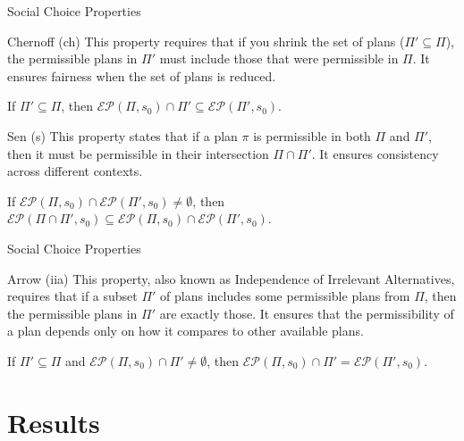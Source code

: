 \documentclass[compress,xcolor=table]{beamer}
\begin{document}
\begin{frame}{Social Choice Properties}
    \begin{block}{Chernoff (ch)}
        This property requires that if you shrink the set of plans (\(\Pi' \subseteq \Pi\)), the permissible plans in \(\Pi'\) must include those that were permissible in \(\Pi\). It ensures fairness when the set of plans is reduced.
    \end{block}
    If \(\Pi' \subseteq \Pi\), then \(\mathcal{EP}(\Pi, s_0) \cap \Pi' \subseteq \mathcal{EP}(\Pi', s_0)\).
    \pause
    \begin{block}{Sen (s)}
        This property states that if a plan \(\pi\) is permissible in both \(\Pi\) and \(\Pi'\), then it must be permissible in their intersection \(\Pi \cap \Pi'\). It ensures consistency across different contexts.
    \end{block}
    If \(\mathcal{EP}(\Pi, s_0) \cap \mathcal{EP}(\Pi', s_0) \neq \emptyset\), then \(\mathcal{EP}(\Pi \cap \Pi', s_0) \subseteq \mathcal{EP}(\Pi, s_0) \cap \mathcal{EP}(\Pi', s_0)\).

\end{frame}


\begin{frame}{Social Choice Properties}
    \begin{block}{Arrow (iia)}
        This property, also known as Independence of Irrelevant Alternatives, requires that if a subset \(\Pi'\) of plans includes some permissible plans from \(\Pi\), then the permissible plans in \(\Pi'\) are exactly those. It ensures that the permissibility of a plan depends only on how it compares to other available plans.
    \end{block}
    If \(\Pi' \subseteq \Pi\) and \(\mathcal{EP}(\Pi, s_0) \cap \Pi' \neq \emptyset\), then \(\mathcal{EP}(\Pi, s_0) \cap \Pi' = \mathcal{EP}(\Pi', s_0)\).
\end{frame}


\section{Results}
\end{document}
